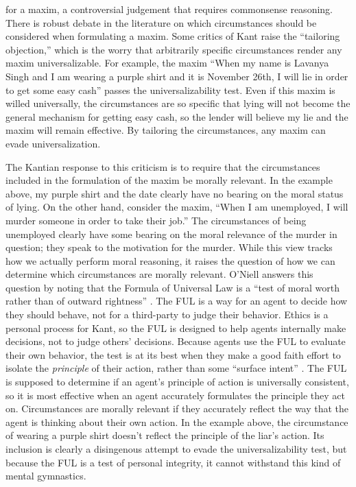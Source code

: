 \begin{isabellebody}
\begin{isamarkuptext}
for a maxim, a controversial judgement that requires commonsense reasoning.
There is robust debate in the literature on which circumstances should be considered when formulating a maxim. 
Some critics of Kant raise the ``tailoring objection,'' which is the worry that arbitrarily specific 
circumstances render any maxim universalizable. For example, the maxim ``When my name is Lavanya Singh 
and I am wearing a purple shirt and it is November 26th, I will lie in order to get some easy cash'' 
passes the universalizability test. Even if this maxim is willed universally, the circumstances are so 
specific that lying will not become the general mechanism for getting easy cash, so the lender will 
believe my lie and the maxim will remain effective. By tailoring the circumstances, any maxim can 
evade universalization.

The Kantian response to this criticism is to require that the circumstances included in the formulation
of the maxim be morally relevant. In the example above, my purple shirt and the date clearly have no bearing on 
the moral status of lying. On the other hand, consider the maxim, ``When I am unemployed, I will murder
someone in order to take their job.'' The circumstances of being unemployed clearly have some bearing on the moral
relevance of the murder in question; they speak to the motivation for the murder. While this view 
tracks how we actually perform moral reasoning, it raises the question of how we can determine
which circumstances are morally relevant. O'Niell answers this question by noting that the Formula of Universal Law is 
a ``test of moral worth rather than of outward rightness'' \citep[98]{constofreason}. The FUL is a way 
for an agent to decide how they should behave, not for a third-party to judge their behavior. Ethics is 
a personal process for Kant, so the FUL is designed to help agents internally make decisions, not to 
judge others' decisions. Because agents use the FUL to evaluate their own behavior, the test is at its 
best when they make a good faith effort to isolate the \emph{principle} of their action, rather than some
``surface intent'' \citep[87]{constofreason}. The FUL is supposed to determine if an agent's principle of action
is universally consistent, so it is most effective when an agent accurately formulates the principle
they act on. Circumstances are morally relevant if they accurately reflect the way that the agent is 
thinking about their own action. In the example above, the circumstance of wearing a purple shirt doesn't reflect
the principle of the liar's action. Its inclusion is clearly a disingenous attempt to evade the universalizability
test, but because the FUL is a test of personal integrity, it cannot withstand this kind of mental
gymnastics.


\end{isamarkuptext}
\end{isabellebody}

